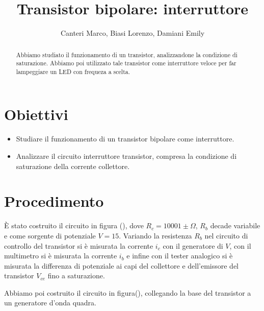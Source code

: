 \documentclass[letterpaper,11pt]{article}
\title{\textbf{Transistor bipolare:} interruttore}
\author{Canteri Marco, Biasi Lorenzo, Damiani Emily}
\date{}  %
\begin{document}
\maketitle

\begin{abstract}
Abbiamo studiato il funzionamento di un transistor, analizzandone la condizione di saturazione. Abbiamo poi utilizzato tale transistor come interruttore veloce per far lampeggiare un LED con frequeza a scelta.
\end{abstract}

\begin{body}
\section{Obiettivi}
\begin{itemize}
\item Studiare il funzionamento di un transistor bipolare come interruttore.
\item Analizzare il circuito interruttore transistor, compresa la condizione di saturazione della
corrente collettore.
\end{itemize}
\section{Procedimento}
È stato costruito il circuito in figura (), dove $R_c = 10001 \pm \Omega$, $R_b$ decade variabile e come sorgente di potenziale $V=15$. Variando la resistenza $R_b$ nel circuito di controllo del transistor si è misurata la corrente $i_c$ con il generatore di $V$, con il multimetro si è misurata la corrente $i_b$ e infine con il tester analogico si è misurata la differenza di potenziale ai capi del collettore e dell'emissore del transistor $V_{ce}$ fino a saturazione.

Abbiamo poi costruito il circuito in figura(), collegando la base del transistor a un generatore d'onda quadra.
\end{body}
\end{document}
